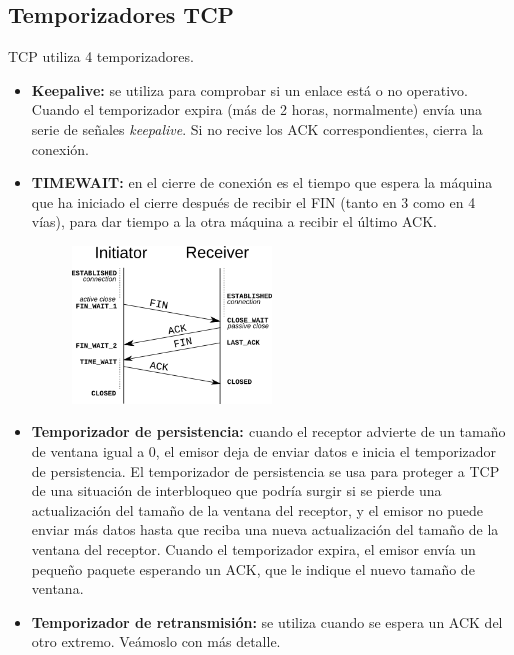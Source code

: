 \newpage
\subsection{Temporizadores TCP}
TCP utiliza 4 temporizadores.
\begin{itemize}
    \item \textbf{Keepalive: }se utiliza para comprobar si un enlace está o no operativo. Cuando el temporizador expira (más de 2 horas, normalmente) envía una serie de señales \textit{keepalive}. Si no recive los ACK correspondientes, cierra la conexión.
    \item \textbf{TIMEWAIT: }en el cierre de conexión es el tiempo que espera la máquina que ha iniciado el cierre después de recibir el FIN (tanto en 3 como en 4 vías), para dar tiempo a la otra máquina a recibir el último ACK.
    \begin{figure}[H] \centering
    \includegraphics[width=0.5\textwidth]{img/TCP_TIMEWAIT.png}\end{figure}
    \item \textbf{Temporizador de persistencia: \label{tempers}}cuando el receptor advierte de un tamaño de ventana igual a 0, el emisor deja de enviar datos e inicia el temporizador de persistencia. El temporizador de persistencia se usa para proteger a TCP de una situación de interbloqueo que podría surgir si se pierde una actualización del tamaño de la ventana del receptor, y el emisor no puede enviar más datos hasta que reciba una nueva actualización del tamaño de la ventana del receptor. Cuando el temporizador expira, el emisor envía un pequeño paquete esperando un ACK, que le indique el nuevo tamaño de ventana.
    \item \textbf{Temporizador de retransmisión: }se utiliza cuando se espera un ACK del otro extremo. Veámoslo con más detalle.
\end{itemize}
\newpage
